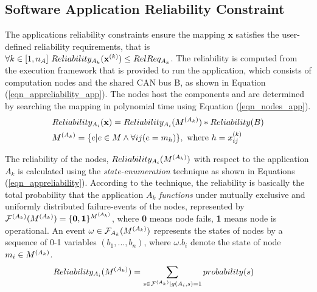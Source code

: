 \subsection{Software Application Reliability Constraint}\label{subsec_reliability_constraint}
The applications reliability constraints ensure the mapping $\textbf{x}$ satisfies the user-defined reliability requirements, that is $ \forall k\in [1,n_A]\ Reliability_{A_k}(\textbf{x}^{(k)})\leq RelReq_{A_k}$. 
The reliability  is computed from the execution framework that is provided to run the application, which consists of computation nodes  and the shared CAN bus B, as shown in Equation (\ref{eqn_appreliability_app}). The nodes  host the components  and are determined by searching the mapping   in polynomial time using Equation (\ref{eqn_nodes_app}).
\begin{align}
	\label{eqn_appreliability_app}
	&Reliability_{A_i}(\ttx)=Reliability_{A_i}(\ttssp{M})*Reliability(B)\\
	\label{eqn_nodes_app}
	&\ttssp{M}=\{e|e\in M \land \forall ij (e=m_h) \},\mbox{ where } h=\ttssx{k}{ij} 
\end{align}

The reliability of the nodes, $Reliability_{A_i}(\ttssp{M})$ with respect to the application ${A_k}$ is calculated using the \textit{state-enumeration} technique \cite{Lucet1999ExactReliability}  as shown in Equations (\ref{eqn_appreliability}). According to the technique, the reliability is basically the total probability that the application $A_k$ \textit{functions} under mutually exclusive and uniformly distributed failure-events of the nodes, represented by $\ttssp{\mathcal{F}}(\ttssp{M})=\{\textbf{0},\textbf{1}\}^{\ttssp{M}}$, where  \textbf{0} means node fails, \textbf{1} means  node is operational. An event $\omega\in \mathcal{F}_{A_k}(\ttssp{M})$ represents the states of nodes by a sequence of 0-1 variables $(b_1,...,b_n)$, where $\omega.b_i$ denote the state of node $m_i\in \ttssp{M}$. %
\begin{align}
\label{eqn_appreliability}
Reliability_{A_i}(\ttssp{M})&=\sum_{s\in \ttssp{\mathcal{F}}|g(A_i, s)=1}probability(s)
\end{align}

